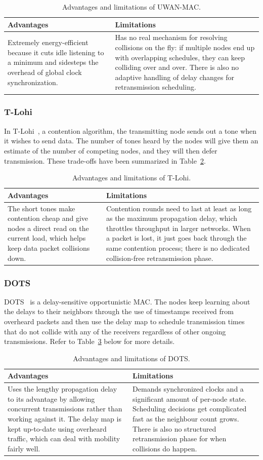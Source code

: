 \documentclass{article}
\newcommand{\advlim}[3]{%
\begin{table}[H]
\centering
\caption{#1}
\small
\setstretch{1.2}
\renewcommand{\arraystretch}{1.3}
\setlength{\tabcolsep}{8pt}
\begin{tabular}{|>{\raggedright\arraybackslash}p{0.42\textwidth}|>{\raggedright\arraybackslash}p{0.42\textwidth}|}
\hline
\textbf{Advantages} & \textbf{Limitations} \\
\hline
\rule{0pt}{3.2ex}#2\vspace{5pt} & \rule{0pt}{3.2ex}#3\vspace{5pt} \\
\hline
\end{tabular}
\end{table}}
\begin{document}
\advlim{Advantages and limitations of UWAN-MAC.\label{tab:uwan}}
{Extremely energy-efficient because it cuts idle listening to a minimum and sidesteps the overhead of global clock synchronization.}
{Has no real mechanism for resolving collisions on the fly: if multiple nodes end up with overlapping schedules, they can keep colliding over and over. There is also no adaptive handling of delay changes for retransmission scheduling.}

\subsubsection{T-Lohi}
In T-Lohi~\cite{tlohi2008}, a contention algorithm, the transmitting node sends out a tone when it wishes to send data. The number of tones heard by the nodes will give them an estimate of the number of competing nodes, and they will then defer transmission. These trade-offs have been summarized in Table~\ref{tab:tlohi}.

\advlim{Advantages and limitations of T-Lohi.\label{tab:tlohi}}
{The short tones make contention cheap and give nodes a direct read on the current load, which helps keep data packet collisions down.}
{Contention rounds need to last at least as long as the maximum propagation delay, which throttles throughput in larger networks. When a packet is lost, it just goes back through the same contention process; there is no dedicated collision-free retransmission phase.}

\subsubsection{DOTS}
DOTS~\cite{dots2014} is a delay-sensitive opportunistic MAC. The nodes keep learning about the delays to their neighbors through the use of timestamps received from overheard packets and then use the delay map to schedule transmission times that do not collide with any of the receivers regardless of other ongoing transmissions. Refer to Table~\ref{tab:dots} below for more details.

\advlim{Advantages and limitations of DOTS.\label{tab:dots}}
{Uses the lengthy propagation delay to its advantage by allowing concurrent transmissions rather than working against it. The delay map is kept up-to-date using overheard traffic, which can deal with mobility fairly well.}
{Demands synchronized clocks and a significant amount of per-node state. Scheduling decisions get complicated fast as the neighbour count grows. There is also no structured retransmission phase for when collisions do happen.}
\end{document}
